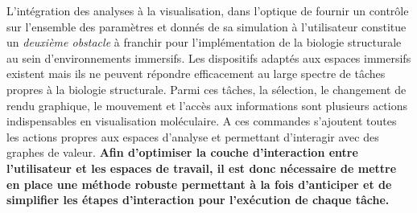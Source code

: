 L'intégration des analyses à la visualisation, dans l'optique de fournir un contrôle sur l'ensemble des paramètres et donnés de sa simulation à l'utilisateur constitue un \textit{deuxième obstacle} à franchir pour l'implémentation de la biologie structurale au sein d'environnements immersifs.
Les dispositifs adaptés aux espaces immersifs existent mais ils ne peuvent répondre efficacement au large spectre de tâches propres à la biologie structurale. Parmi ces tâches, la sélection, le changement de rendu graphique, le mouvement et l'accès aux informations sont plusieurs actions indispensables en visualisation moléculaire. A ces commandes s'ajoutent toutes les actions propres aux espaces d'analyse et permettant d'interagir avec des graphes de valeur. 
\textbf{Afin d'optimiser la couche d'interaction entre l'utilisateur et les espaces de travail, il est donc nécessaire de mettre en place une méthode robuste permettant à la fois d'anticiper et de simplifier les étapes d'interaction pour l'exécution de chaque tâche.}




